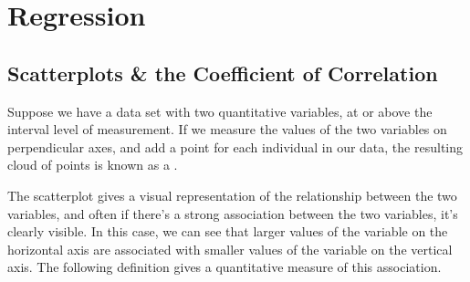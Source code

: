 \pagestyle{headings}
\chapter{Regression} \label{chp 6}

\section{Scatterplots \& the Coefficient of Correlation}

Suppose we have a data set with two quantitative variables, at or above the interval level of measurement. If we measure the values of the two variables on perpendicular axes, and add a point for each individual in our data, the resulting cloud of points is known as a .

\begin{center}
\end{center}

The scatterplot gives a visual representation of the relationship between the two variables, and often if there's a strong association between the two variables, it's clearly visible. In this case, we can see that larger values of the variable on the horizontal axis are associated with smaller values of the variable on the vertical axis. The following definition gives a quantitative measure of this association.


